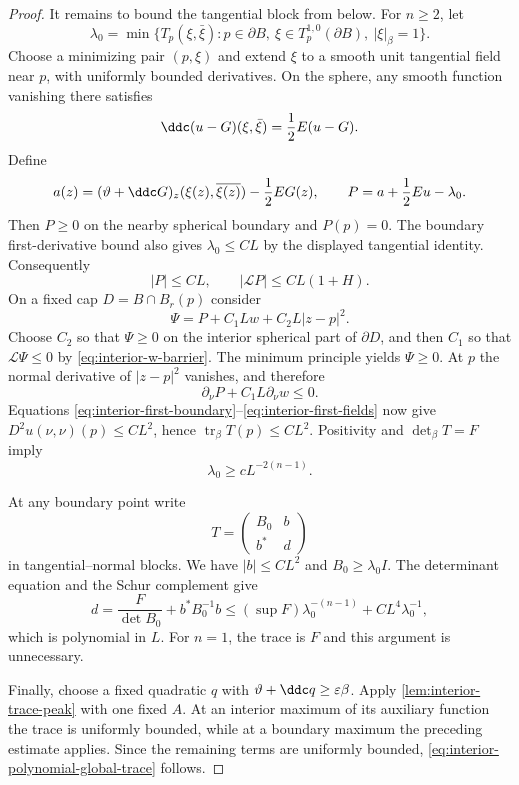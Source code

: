 \begin{proof}
It remains to bound the tangential block from below. For $n\geq2$, let
\[
  \lambda_0=\min\{T_p(\xi,\bar\xi):p\in\partial B,
  \ \xi\in T_p^{1,0}(\partial B),\ |\xi|_\beta=1\}.
\]
Choose a minimizing pair $(p,\xi)$ and extend $\xi$ to a smooth unit tangential field near $p$, with uniformly bounded derivatives. On the sphere, any smooth function vanishing there satisfies
\[
  \ddc(u-G)(\xi,\bar\xi)=\frac12E(u-G).
\]
Define
\[
  a(z)=(\vartheta+\ddc G)_z(\xi(z),\overline{\xi(z)})-\frac12EG(z),
  \qquad
  P=a+\frac12Eu-\lambda_0.
\]
Then $P\geq0$ on the nearby spherical boundary and $P(p)=0$.
The boundary first-derivative bound also gives $\lambda_0\leq CL$ by
the displayed tangential identity. Consequently
\[
  |P|\leq CL,
  \qquad
  |\mathcal LP|\leq CL(1+H).
\]
On a fixed cap $D=B\cap B_r(p)$ consider
\[
  \Psi=P+C_1Lw+C_2L|z-p|^2.
\]
Choose $C_2$ so that $\Psi\geq0$ on the interior spherical part of $\partial D$, and then $C_1$ so that $\mathcal L\Psi\leq0$ by \eqref{eq:interior-w-barrier}. The minimum principle yields $\Psi\geq0$. At $p$ the normal derivative of $|z-p|^2$ vanishes, and therefore
\[
  \partial_\nu P+C_1L\partial_\nu w\leq0.
\]
Equations \eqref{eq:interior-first-boundary}--\eqref{eq:interior-first-fields} now give $D^2u(\nu,\nu)(p)\leq CL^2$, hence $\operatorname{tr}_\beta T(p)\leq CL^2$. Positivity and $\det_\beta T=F$ imply
\begin{equation}\label{eq:interior-tangential-lower}
  \lambda_0\geq cL^{-2(n-1)}.
\end{equation}

At any boundary point write
\[
  T=\begin{pmatrix}B_0&b\\ b^*&d\end{pmatrix}
\]
in tangential--normal blocks. We have $|b|\leq CL^2$ and $B_0\geq\lambda_0I$. The determinant equation and the Schur complement give
\[
  d=\frac{F}{\det B_0}+b^*B_0^{-1}b
  \leq(\sup F)\lambda_0^{-(n-1)}+CL^4\lambda_0^{-1},
\]
which is polynomial in $L$. For $n=1$, the trace is $F$ and this argument is unnecessary.

Finally, choose a fixed quadratic $q$ with $\vartheta+\ddc q\geq\varepsilon\beta$. Apply \cref{lem:interior-trace-peak} with one fixed $A$. At an interior maximum of its auxiliary function the trace is uniformly bounded, while at a boundary maximum the preceding estimate applies. Since the remaining terms are uniformly bounded, \eqref{eq:interior-polynomial-global-trace} follows.
\end{proof}


